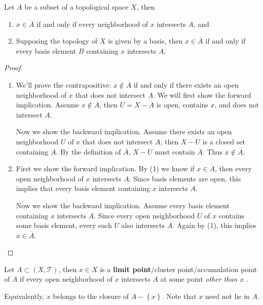 \documentclass[10pt]{report}
\begin{document}
\begin{thrm}
	\label{thrm:nhood-closure}
Let $A$ be a subset of a topological space $X$, then
\begin{enumerate}
	\item $x \in \overline{A}$ if and only if every neighborhood of $x$ intersects $A$, and
	\item Supposing the topology of $X$ is given by a basis, then $x \in \overline{A}$ if and only if every basis element $B$ containing $x$ intersects $A$.
\end{enumerate}
\end{thrm}
\begin{proof}
	\begin{enumerate}
		\item We'll prove the contrapositive: $x \not\in \overline{A}$ if and only if there exists an open neighborhood of $x$ that does not intersect $A$. We will first show the forward implication. Assume $x \not\in \overline{A}$, then $U = X-\overline{A}$ is open, contains $x$, and does not intersect $A$.

			Now we show the backward implication. Assume there exists an open neighborhood $U$ of $x$ that does not intersect $A$, then $X-U$ is a closed set containing $A$. By the definition of $\overline{A}$, $X-U$ must contain $\overline{A}$. Thus $x \not\in \overline{A}$.

		\item First we show the forward implication. By (1) we know if $x \in  \overline{A}$, then every open neighborhood of $x$ intersects $A$. Since basis elements are open, this implies that every basis element containing $x$ intersects $A$.

			Now we show the backward implication. Assume every basis element containing $x$ intersects $A$. Since every open neighborhood $U$ of $x$ contains some basis element, every such $U$ also intersects $A$. Again by (1), this implies $x \in \overline{A}$.
	\end{enumerate}
\end{proof}

\begin{defn}
	Let $A \subset (X,\mathcal{T})$, then $x \in X$ is a \textbf{limit point}/cluster point/accumulation point of $A$ if every open neighborhood of $x$ intersects $A$ at some point \textit{other than $x$ }.

	Equivalently, $x$ belongs to the closure of $A - \left\{ x \right\}$. Note that $x$ need not lie in $A$.
\end{defn}
\end{document}
